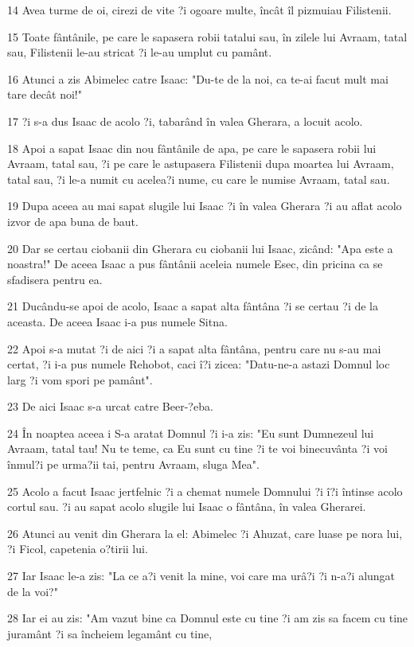 \par 14 Avea turme de oi, cirezi de vite ?i ogoare multe, încât îl pizmuiau Filistenii.
\par 15 Toate fântânile, pe care le sapasera robii tatalui sau, în zilele lui Avraam, tatal sau, Filistenii le-au stricat ?i le-au umplut cu pamânt.
\par 16 Atunci a zis Abimelec catre Isaac: "Du-te de la noi, ca te-ai facut mult mai tare decât noi!"
\par 17 ?i s-a dus Isaac de acolo ?i, tabarând în valea Gherara, a locuit acolo.
\par 18 Apoi a sapat Isaac din nou fântânile de apa, pe care le sapasera robii lui Avraam, tatal sau, ?i pe care le astupasera Filistenii dupa moartea lui Avraam, tatal sau, ?i le-a numit cu acelea?i nume, cu care le numise Avraam, tatal sau.
\par 19 Dupa aceea au mai sapat slugile lui Isaac ?i în valea Gherara ?i au aflat acolo izvor de apa buna de baut.
\par 20 Dar se certau ciobanii din Gherara cu ciobanii lui Isaac, zicând: "Apa este a noastra!" De aceea Isaac a pus fântânii aceleia numele Esec, din pricina ca se sfadisera pentru ea.
\par 21 Ducându-se apoi de acolo, Isaac a sapat alta fântâna ?i se certau ?i de la aceasta. De aceea Isaac i-a pus numele Sitna.
\par 22 Apoi s-a mutat ?i de aici ?i a sapat alta fântâna, pentru care nu s-au mai certat, ?i i-a pus numele Rehobot, caci î?i zicea: "Datu-ne-a astazi Domnul loc larg ?i vom spori pe pamânt".
\par 23 De aici Isaac s-a urcat catre Beer-?eba.
\par 24 În noaptea aceea i S-a aratat Domnul ?i i-a zis: "Eu sunt Dumnezeul lui Avraam, tatal tau! Nu te teme, ca Eu sunt cu tine ?i te voi binecuvânta ?i voi înmul?i pe urma?ii tai, pentru Avraam, sluga Mea".
\par 25 Acolo a facut Isaac jertfelnic ?i a chemat numele Domnului ?i î?i întinse acolo cortul sau. ?i au sapat acolo slugile lui Isaac o fântâna, în valea Gherarei.
\par 26 Atunci au venit din Gherara la el: Abimelec ?i Ahuzat, care luase pe nora lui, ?i Ficol, capetenia o?tirii lui.
\par 27 Iar Isaac le-a zis: "La ce a?i venit la mine, voi care ma urâ?i ?i n-a?i alungat de la voi?"
\par 28 Iar ei au zis: "Am vazut bine ca Domnul este cu tine ?i am zis sa facem cu tine juramânt ?i sa încheiem legamânt cu tine,
